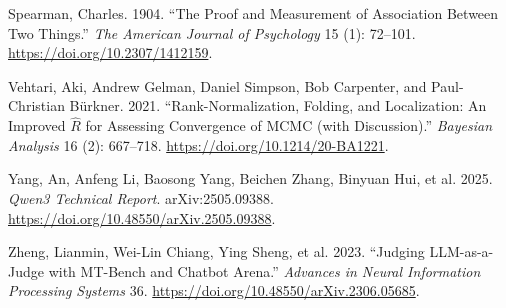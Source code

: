 \documentclass[11pt]{article}
\newlength{\cslhangindent}
\newenvironment{CSLReferences}[2] %
 {\begin{list}{}{%
  \setlength{\itemindent}{0pt}
  \setlength{\leftmargin}{0pt}
  \setlength{\parsep}{0pt}
  \ifodd #1
   \setlength{\leftmargin}{\cslhangindent}
   \setlength{\itemindent}{-1\cslhangindent}
  \fi
  \setlength{\itemsep}{#2\baselineskip}}}
 {\end{list}}
\begin{document}
\begin{CSLReferences}{1}{1}
Spearman, Charles. 1904. {``The Proof and Measurement of Association
Between Two Things.''} \emph{The American Journal of Psychology} 15 (1):
72--101. \url{https://doi.org/10.2307/1412159}.

Vehtari, Aki, Andrew Gelman, Daniel Simpson, Bob Carpenter, and
Paul-Christian Bürkner. 2021. {``Rank-Normalization, Folding, and
Localization: An Improved \(\widehat{R}\) for Assessing Convergence of
{MCMC} (with Discussion).''} \emph{Bayesian Analysis} 16 (2): 667--718.
\url{https://doi.org/10.1214/20-BA1221}.

{Yang, An, Anfeng Li, Baosong Yang, Beichen Zhang, Binyuan Hui, et al.}
2025. \emph{Qwen3 Technical Report}. arXiv:2505.09388.
\url{https://doi.org/10.48550/arXiv.2505.09388}.

Zheng, Lianmin, Wei-Lin Chiang, Ying Sheng, et al. 2023. {``Judging
{LLM}-as-a-Judge with {MT-Bench} and Chatbot Arena.''} \emph{Advances in
Neural Information Processing Systems} 36.
\url{https://doi.org/10.48550/arXiv.2306.05685}.

\end{CSLReferences}
\end{document}
